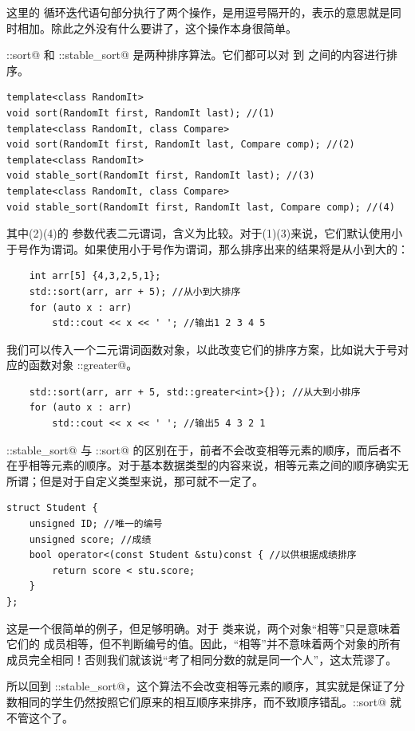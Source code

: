 这里的 \lstinline@for@ 循环迭代语句部分执行了两个操作，是用逗号隔开的，表示的意思就是同时相加。除此之外没有什么要讲了，这个操作本身很简单。\par
\lstinline@std::sort@ 和 \lstinline@std::stable_sort@ 是两种排序算法。它们都可以对 \lstinline@first@ 到 \lstinline@last@ 之间的内容进行排序。
\begin{lstlisting}
template<class RandomIt>
void sort(RandomIt first, RandomIt last); //(1)
template<class RandomIt, class Compare>
void sort(RandomIt first, RandomIt last, Compare comp); //(2)
template<class RandomIt>
void stable_sort(RandomIt first, RandomIt last); //(3)
template<class RandomIt, class Compare>
void stable_sort(RandomIt first, RandomIt last, Compare comp); //(4)
\end{lstlisting}
其中(2)(4)的 \lstinline@comp@ 参数代表二元谓词，含义为比较。对于(1)(3)来说，它们默认使用小于号作为谓词。如果使用小于号作为谓词，那么排序出来的结果将是从小到大的：
\begin{lstlisting}
    int arr[5] {4,3,2,5,1};
    std::sort(arr, arr + 5); //从小到大排序
    for (auto x : arr)
        std::cout << x << ' '; //输出1 2 3 4 5
\end{lstlisting}
我们可以传入一个二元谓词函数对象，以此改变它们的排序方案，比如说大于号对应的函数对象 \lstinline@std::greater@。
\begin{lstlisting}
    std::sort(arr, arr + 5, std::greater<int>{}); //从大到小排序
    for (auto x : arr)
        std::cout << x << ' '; //输出5 4 3 2 1
\end{lstlisting}\par
\lstinline@std::stable_sort@ 与 \lstinline@std::sort@ 的区别在于，前者不会改变相等元素的顺序，而后者不在乎相等元素的顺序。对于基本数据类型的内容来说，相等元素之间的顺序确实无所谓；但是对于自定义类型来说，那可就不一定了。
\begin{lstlisting}
struct Student {
    unsigned ID; //唯一的编号
    unsigned score; //成绩
    bool operator<(const Student &stu)const { //以供根据成绩排序
        return score < stu.score;
    }
};
\end{lstlisting}
这是一个很简单的例子，但足够明确。对于 \lstinline@Student@ 类来说，两个对象``相等''只是意味着它们的 \lstinline@score@ 成员相等，但不判断编号的值。因此，``相等''并不意味着两个对象的所有成员完全相同！否则我们就该说``考了相同分数的就是同一个人''，这太荒谬了。\par
所以回到 \lstinline@std::stable_sort@，这个算法不会改变相等元素的顺序，其实就是保证了分数相同的学生仍然按照它们原来的相互顺序来排序，而不致顺序错乱。\lstinline@std::sort@ 就不管这个了。\par
